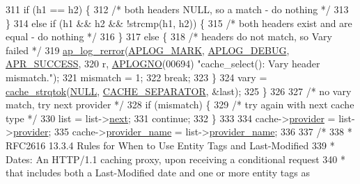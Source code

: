 \begin{DoxyCode}
311                 \textcolor{keywordflow}{if} (h1 == h2) \{
312                     \textcolor{comment}{/* both headers NULL, so a match - do nothing */}
313                 \}
314                 \textcolor{keywordflow}{else} \textcolor{keywordflow}{if} (h1 && h2 && !strcmp(h1, h2)) \{
315                     \textcolor{comment}{/* both headers exist and are equal - do nothing */}
316                 \}
317                 \textcolor{keywordflow}{else} \{
318                     \textcolor{comment}{/* headers do not match, so Vary failed */}
319                     \hyperlink{group__APACHE__CORE__LOG_ga4c112558ccffd6b363da102b2052d2a6}{ap\_log\_rerror}(\hyperlink{group__APACHE__CORE__LOG_ga655e126996849bcb82e4e5a14c616f4a}{APLOG\_MARK}, \hyperlink{group__APACHE__CORE__LOG_gadfcef90537539cf2b7d35cfbbbafeb93}{APLOG\_DEBUG}, 
      \hyperlink{group__apr__errno_ga9ee311b7bf1c691dc521d721339ee2a6}{APR\_SUCCESS},
320                             r, \hyperlink{group__APACHE__CORE__LOG_ga1dee8a07e06bc5b3de8b89662c2cd666}{APLOGNO}(00694) \textcolor{stringliteral}{"cache\_select(): Vary header mismatch."});
321                     mismatch = 1;
322                     \textcolor{keywordflow}{break};
323                 \}
324                 vary = \hyperlink{group__Cache__util_gada03570414af2b2d9349449858036d90}{cache\_strqtok}(\hyperlink{pcre_8txt_ad7f989d16aa8ca809a36bc392c07fba1}{NULL}, \hyperlink{group__Cache__util_ga2916636af38fdf277cb80c1c698c291a}{CACHE\_SEPARATOR}, &last);
325             \}
326 
327             \textcolor{comment}{/* no vary match, try next provider */}
328             \textcolor{keywordflow}{if} (mismatch) \{
329                 \textcolor{comment}{/* try again with next cache type */}
330                 list = list->\hyperlink{structcache__provider__list_a87c07afc8bb63fe7fd2e9274e60341a9}{next};
331                 \textcolor{keywordflow}{continue};
332             \}
333 
334             cache->\hyperlink{structcache__request__rec_aa97c7f2b0167adee182cce9f2c66b0eb}{provider} = list->\hyperlink{structcache__provider__list_a1e1caa5b70698f255962728326dc1be3}{provider};
335             cache->\hyperlink{structcache__request__rec_ad15b24a12858815a315f37152111b41d}{provider\_name} = list->\hyperlink{structcache__provider__list_a0bd2adbaa02f1aa6af1971fd24b09b6a}{provider\_name};
336 
337             \textcolor{comment}{/*}
338 \textcolor{comment}{             * RFC2616 13.3.4 Rules for When to Use Entity Tags and Last-Modified}
339 \textcolor{comment}{             * Dates: An HTTP/1.1 caching proxy, upon receiving a conditional request}
340 \textcolor{comment}{             * that includes both a Last-Modified date and one or more entity tags as}

\end{DoxyCode}
